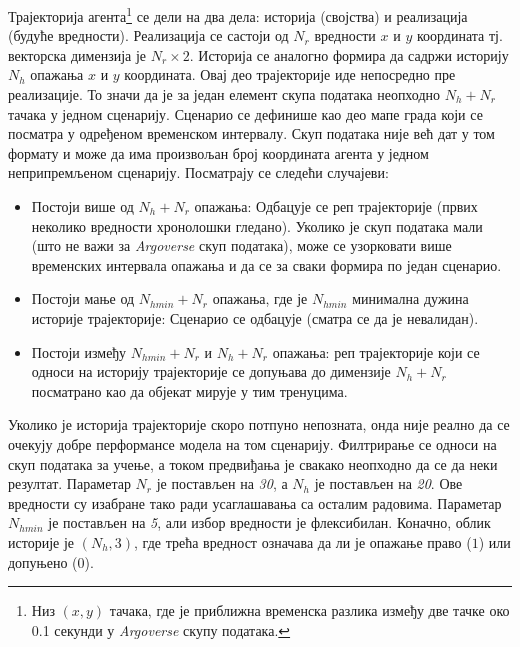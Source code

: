 \documentclass[11pt,oneside]{memoir}
\begin{document}
Трајекторија агента\footnote{Низ $(x, y)$ тачака, где је приближна временска разлика између две тачке око 0.1 секунди у \textit{Argoverse}
скупу података.} 
се дели на два дела: историја (својства) и реализација (будуће вредности). Реализација се састоји од $N_r$ вредности
$x$ и $y$ координата тј. векторска димензија је $N_r\times 2$.
Историја се аналогно формира да садржи историју $N_h$ опажања $x$ и $y$ координата. Овај део трајекторије иде непосредно
пре реализације. То значи да је за један елемент скупа података неопходно $N_h + N_r$ тачака у једном сценарију. 
Сценарио се дефинише као део мапе града који се посматра
у одређеном временском интервалу. Скуп података није већ
дат у том формату и може да има произвољан број координата агента у једном неприпремљеном сценарију. Посматрају се следећи случајеви:
\begin{itemize}
  \item Постоји више од $N_h + N_r$ опажања: Одбацује се реп трајекторије (првих неколико вредности хронолошки гледано).
        Уколико је скуп података мали (што не важи за \textit{Argoverse} скуп података), може се узорковати више временских интервала
        опажања и да се за сваки формира по један сценарио.
  \item Постоји мање од $N_{hmin} + N_r$ опажања, где је $N_{hmin}$ минимална дужина историје трајекторије: Сценарио се одбацује (сматра се да је невалидан).
  \item Постоји између $N_{hmin} + N_r$ и $N_h + N_r$ опажања: реп трајекторије који се односи на историју трајекторије 
        се допуњава до димензије $N_h + N_r$ посматрано као да објекат мирује у тим тренуцима.
\end{itemize}
Уколико је историја
трајекторије скоро потпуно непозната, онда није реално да се очекују добре перформансе модела на том сценарију. Филтрирање се
односи на скуп података за учење, а током предвиђања је свакако неопходно да се да неки резултат. Параметар $N_r$ је постављен на \textit{30},
а $N_h$ је постављен на \textit{20}. Ове вредности су изабране тако ради усаглашавања са осталим радовима. Параметар $N_{hmin}$ је
постављен на \textit{5}, али избор вредности је флексибилан. 
Коначно, облик историје је $(N_h, 3)$, где трећа вредност означава да ли је опажање право ($1$) или допуњено ($0$).
\end{document}
